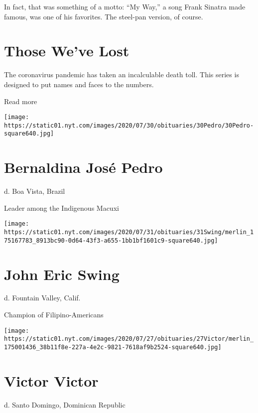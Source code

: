 In fact, that was something of a motto: ``My Way,'' a song Frank Sinatra
made famous, was one of his favorites. The steel-pan version, of course.

\href{https://www.nytimes.com/interactive/2020/obituaries/people-died-coronavirus-obituaries.html?action=click\&pgtype=Article\&state=default\&region=BELOW_MAIN_CONTENT\&context=covid_obits_promo}{}

\hypertarget{those-weve-lost}{%
\section{Those We've Lost}\label{those-weve-lost}}

The coronavirus pandemic has taken an incalculable death toll. This
series is designed to put names and faces to the numbers.

Read more

\texttt{[image: https://static01.nyt.com/images/2020/07/30/obituaries/30Pedro/30Pedro-square640.jpg]}

\hypertarget{bernaldina-josuxe9-pedro}{%
\section{Bernaldina José Pedro}\label{bernaldina-josuxe9-pedro}}

d. Boa Vista, Brazil

Leader among the Indigenous Macuxi

\texttt{[image: https://static01.nyt.com/images/2020/07/31/obituaries/31Swing/merlin\_175167783\_8913bc90-0d64-43f3-a655-1bb1bf1601c9-square640.jpg]}

\hypertarget{john-eric-swing}{%
\section{John Eric Swing}\label{john-eric-swing}}

d. Fountain Valley, Calif.

Champion of Filipino-Americans

\texttt{[image: https://static01.nyt.com/images/2020/07/27/obituaries/27Victor/merlin\_175001436\_38b11f8e-227a-4e2c-9821-7618af9b2524-square640.jpg]}

\hypertarget{victor-victor}{%
\section{Victor Victor}\label{victor-victor}}

d. Santo Domingo, Dominican Republic

